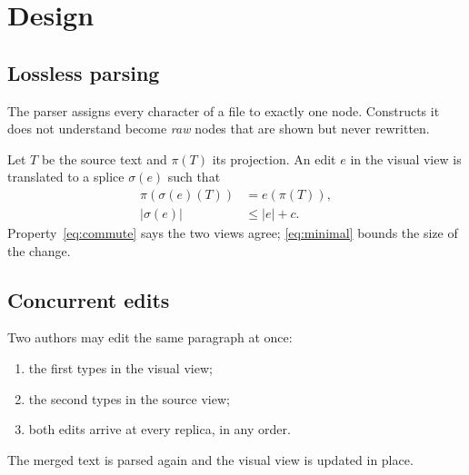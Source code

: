 \section{Design}
\label{sec:method}

\subsection{Lossless parsing}
The parser assigns every character of a file to exactly one node. Constructs it
does not understand become \textit{raw} nodes that are shown but never rewritten.

Let $T$ be the source text and $\pi(T)$ its projection. An edit $e$ in the
visual view is translated to a splice $\sigma(e)$ such that
\begin{align}
  \pi(\sigma(e)(T)) &= e(\pi(T)), \label{eq:commute} \\
  |\sigma(e)| &\le |e| + c . \label{eq:minimal}
\end{align}
Property~\eqref{eq:commute} says the two views agree; \eqref{eq:minimal} bounds
the size of the change.

\subsection{Concurrent edits}
Two authors may edit the same paragraph at once:
\begin{enumerate}
  \item the first types in the visual view;
  \item the second types in the source view;
  \item both edits arrive at every replica, in any order.
\end{enumerate}
The merged text is parsed again and the visual view is updated in place.
